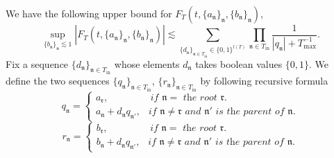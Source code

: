 \begin{lem}\label{lem.boundcoef'}
We have the following upper bound for $F_{T}(t,\{a_{\mathfrak{n}}\}_{\mathfrak{n}},\{b_{\mathfrak{n}}\}_{\mathfrak{n}})$,
\begin{equation}\label{eq.boundcoef'.threewave}
    \sup_{\{b_{\mathfrak{n}}\}_{\mathfrak{n}}\lesssim 1} |F_{T}(t,\{a_{\mathfrak{n}}\}_{\mathfrak{n}},\{b_{\mathfrak{n}}\}_{\mathfrak{n}})|\lesssim \sum_{\{d_{\mathfrak{n}}\}_{\mathfrak{n}\in T_{\text{in}}}\in\{0,1\}^{l(T)}}\prod_{\mathfrak{n}\in T_{\text{in}}}\frac{1}{|q_{\mathfrak{n}}|+T^{-1}_{\text{max}}}.
\end{equation}
Fix a sequence $\{d_{\mathfrak{n}}\}_{\mathfrak{n}\in T_{\text{in}}}$ whose elements $d_{\mathfrak{n}}$ takes boolean values $\{0,1\}$. We define the two sequences $\{q_{\mathfrak{n}}\}_{\mathfrak{n}\in T_{\text{in}}}$, $\{r_{\mathfrak{n}}\}_{\mathfrak{n}\in T_{\text{in}}}$ by following recursive formula
\begin{equation}\label{eq.q_n'.threewave}
    q_{\mathfrak{n}}=
    \begin{cases}
    a_{\mathfrak{r}}, \qquad\qquad \textit{ if $\mathfrak{n}=$ the root $\mathfrak{r}$.}
    \\
    a_{\mathfrak{n}}+d_{\mathfrak{n}}q_{\mathfrak{n}'},\ \ \textit{ if $\mathfrak{n}\neq\mathfrak{r}$ and $\mathfrak{n}'$ is the parent of $\mathfrak{n}$.}
    \end{cases}
\end{equation}
\begin{equation}\label{eq.r_n'.threewave}
    r_{\mathfrak{n}}=
    \begin{cases}
    b_{\mathfrak{r}}, \qquad\qquad \textit{ if $\mathfrak{n}=$ the root $\mathfrak{r}$.}
    \\
    b_{\mathfrak{n}}+d_{\mathfrak{n}}q_{\mathfrak{n}'},\ \ \textit{ if $\mathfrak{n}\neq\mathfrak{r}$ and $\mathfrak{n}'$ is the parent of $\mathfrak{n}$.}
    \end{cases}
\end{equation}

\end{lem}
